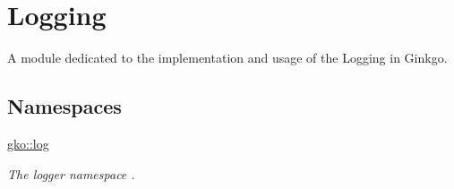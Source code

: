 \hypertarget{group__log}{}\section{Logging}
\label{group__log}


A module dedicated to the implementation and usage of the Logging in Ginkgo.  


\subsection*{Namespaces}
\begin{DoxyCompactItemize}
\item 
 \hyperlink{namespacegko_1_1log}{gko\+::log}
\begin{DoxyCompactList}\small\item\em The logger namespace . \end{DoxyCompactList}\end{DoxyCompactItemize}
